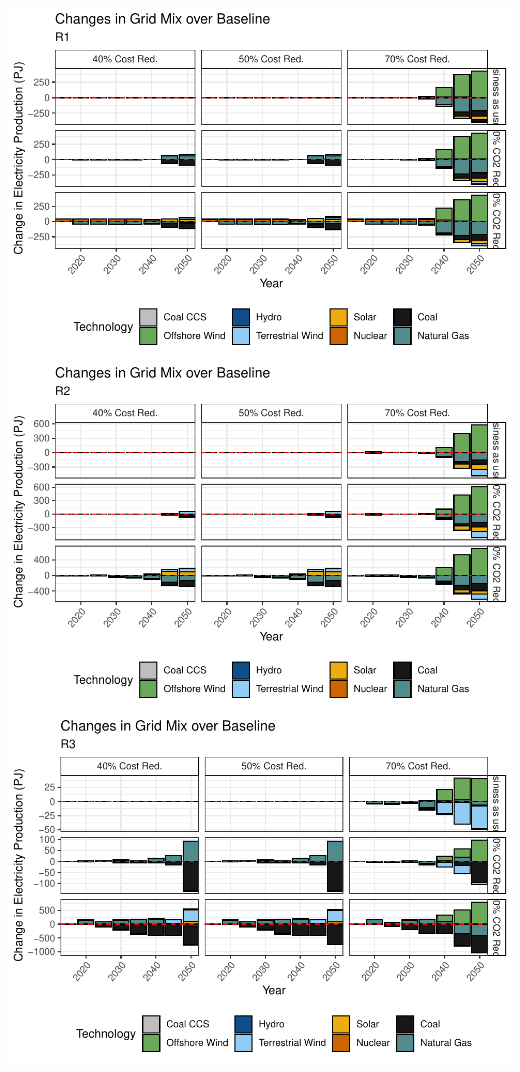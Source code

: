 \documentclass[]{article}
\begin{document}
\includegraphics{osw_Report_files/figure-latex/unnamed-chunk-57-1.pdf}
\includegraphics{osw_Report_files/figure-latex/unnamed-chunk-57-2.pdf}
\includegraphics{osw_Report_files/figure-latex/unnamed-chunk-57-3.pdf}
\end{document}
